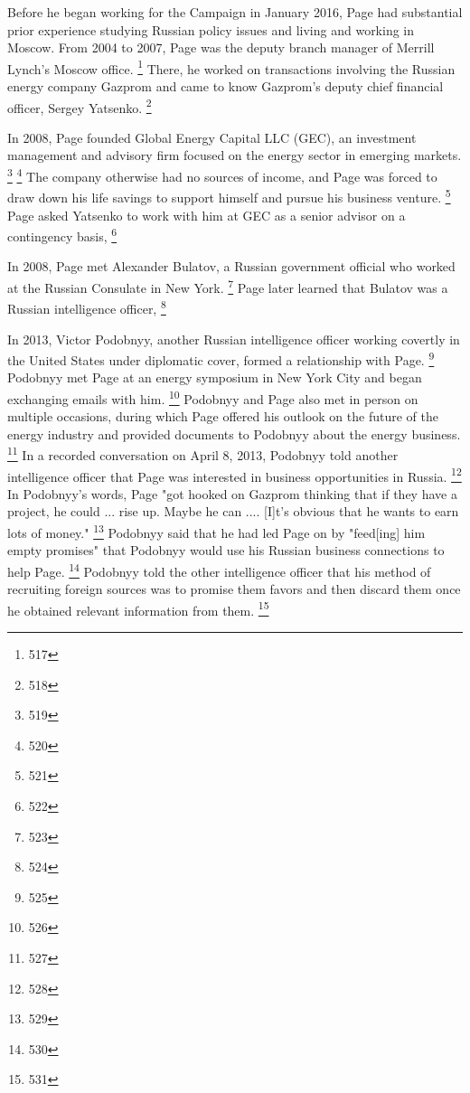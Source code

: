 Before he began working for the Campaign in January 2016, Page had substantial prior experience studying Russian policy issues and living and working in Moscow.
From 2004 to 2007, Page was the deputy branch manager of Merrill Lynch's Moscow office.%
\footnote{517}
There, he worked on transactions involving the Russian energy company Gazprom and came to know Gazprom's deputy chief financial officer, Sergey Yatsenko.%
\footnote{518}

In 2008, Page founded Global Energy Capital LLC (GEC), an investment management and advisory firm focused on the energy sector in emerging markets.%
\footnote{519}
\footnote{520}
The company otherwise had no sources of income, and Page was forced to draw down his life savings to support himself and pursue his business venture.%
\footnote{521}
Page asked Yatsenko to work with him at GEC as a senior advisor on a contingency basis,
\footnote{522}

In 2008, Page met Alexander Bulatov, a Russian government official who worked at the Russian Consulate in New York.%
\footnote{523}
Page later learned that Bulatov was a Russian intelligence officer,
\footnote{524}

In 2013, Victor Podobnyy, another Russian intelligence officer working covertly in the United States under diplomatic cover, formed a relationship with Page.%
\footnote{525}
Podobnyy met Page at an energy symposium in New York City and began exchanging emails with him.%
\footnote{526}
Podobnyy and Page also met in person on multiple occasions, during which Page offered his outlook on the future of the energy industry and provided documents to Podobnyy about the energy business. %
\footnote{527}
In a recorded conversation on April 8, 2013, Podobnyy told another intelligence officer that Page was interested in business opportunities in Russia.%
\footnote{528}
In Podobnyy's words, Page "got hooked on Gazprom thinking that if they have a project, he could ... rise up. Maybe he can .... [I]t's obvious that he wants to earn lots of money."%
\footnote{529}
Podobnyy said that he had led Page on by "feed[ing] him empty promises" that Podobnyy would use his Russian business connections to help Page.%
\footnote{530}
Podobnyy told the other intelligence officer that his method of recruiting foreign sources was to promise them favors and then discard them once he obtained relevant information from them.%
\footnote{531}

